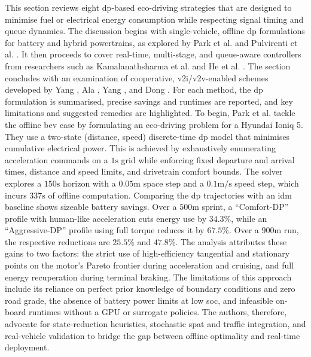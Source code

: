 This section reviews eight \ac{dp}-based eco-driving strategies that are designed to minimise fuel or electrical energy consumption while respecting signal timing and queue dynamics. The discussion begins with single-vehicle, offline \ac{dp} formulations for battery and hybrid powertrains, as explored by Park et al. \cite{Park2024} and Pulvirenti et al. \cite{Pulvirenti2023}. It then proceeds to cover real-time, multi-stage, and queue-aware controllers from researchers such as Kamalanathsharma et al. \cite{Kamalanathsharma2013} and He et al. \cite{He2015}. The section concludes with an examination of cooperative, \ac{v2i}/\ac{v2v}-enabled schemes developed by Yang \cite{Yang2017}, Ala \cite{Ala2016}, Yang \cite{Yang2021}, and Dong \cite{Dong2024}. For each method, the \ac{dp} formulation is summarised, precise savings and runtimes are reported, and key limitations and suggested remedies are highlighted.
\mynewline
To begin, Park et al. \cite{Park2024} tackle the offline \ac{bev} case by formulating an eco-driving problem for a Hyundai Ioniq 5. They use a two-state (distance, speed) discrete-time \ac{dp} model that minimises cumulative electrical power. This is achieved by exhaustively enumerating acceleration commands on a $1\unit{\second}$ grid while enforcing fixed departure and arrival times, distance and speed limits, and drivetrain comfort bounds. The solver explores a $150\unit{\second}$ horizon with a $0.05\unit{\metre}$ space step and a $0.1\unit{\metre\per\second}$ speed step, which incurs $337\unit{\second}$ of offline computation. Comparing the \ac{dp} trajectories with an \ac{idm} baseline shows sizeable battery savings. Over a $500\unit{\metre}$ sprint, a \enquote{Comfort-DP} profile with human-like acceleration cuts energy use by $34.3\%$, while an \enquote{Aggressive-DP} profile using full torque reduces it by $67.5\%$. Over a $900\unit{\metre}$ run, the respective reductions are $25.5\%$ and $47.8\%$. The analysis attributes these gains to two factors: the strict use of high-efficiency tangential and stationary points on the motor's Pareto frontier during acceleration and cruising, and full energy recuperation during terminal braking. The limitations of this approach include its reliance on perfect prior knowledge of boundary conditions and zero road grade, the absence of battery power limits at low \ac{soc}, and infeasible on-board runtimes without a GPU or surrogate policies. The authors, therefore, advocate for state-reduction heuristics, stochastic \ac{spat} and traffic integration, and real-vehicle validation to bridge the gap between offline optimality and real-time deployment.
